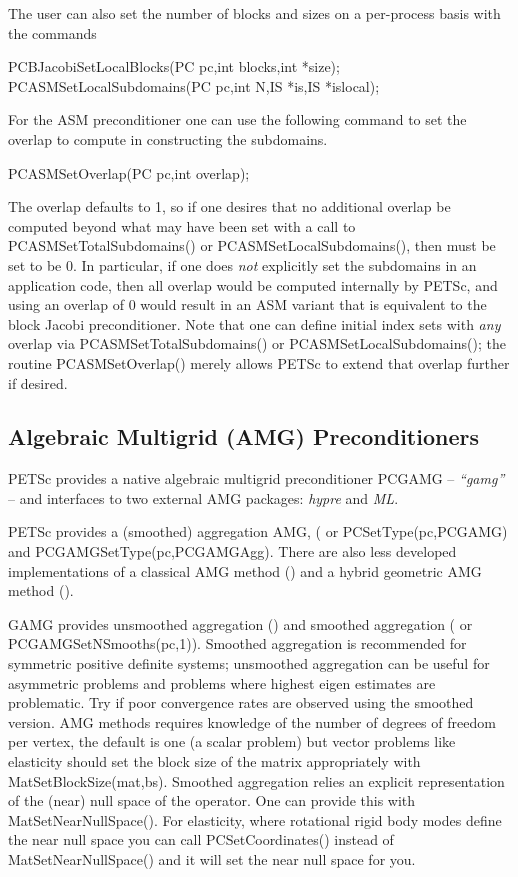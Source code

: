 The user can also set the number of blocks and sizes on a per-process
basis with the commands
\begin{tabbing}
  PCBJacobiSetLocalBlocks(PC pc,int blocks,int *size);\\
  PCASMSetLocalSubdomains(PC pc,int N,IS *is,IS *islocal);
\end{tabbing}

For the ASM preconditioner one can use the following command to set
the overlap to compute in constructing the subdomains.
\begin{tabbing}
  PCASMSetOverlap(PC pc,int overlap);
\end{tabbing}
The overlap defaults to 1, so if one desires that no additional
overlap be computed beyond what may have been set with a call to PCASMSetTotalSubdomains() or PCASMSetLocalSubdomains(), then
 must be set to be 0.  In particular, if one does {\em
not} explicitly set the subdomains in an application code, then all
overlap would be computed internally by PETSc, and using an overlap of
0 would result in an ASM variant that is equivalent to the block
Jacobi preconditioner.  Note that one can define initial index sets
 with {\em any} overlap via PCASMSetTotalSubdomains() or
PCASMSetLocalSubdomains(); the routine PCASMSetOverlap()
merely allows PETSc to extend that overlap further if desired.

\subsection{Algebraic Multigrid (AMG) Preconditioners}

PETSc provides a native algebraic multigrid preconditioner PCGAMG -- {\it ``gamg''} -- and interfaces to two
external AMG packages: {\it hypre} and {\it ML}.

PETSc provides a (smoothed) aggregation AMG, ( or  PCSetType(pc,PCGAMG) and PCGAMGSetType(pc,PCGAMGAgg).
There are also less developed implementations of a classical AMG method ()  and a hybrid geometric AMG method ().

GAMG provides unsmoothed aggregation () and smoothed aggregation ( or PCGAMGSetNSmooths(pc,1)).
Smoothed aggregation is recommended for symmetric positive definite
systems;  unsmoothed aggregation can be useful for asymmetric
problems and problems where highest eigen estimates are problematic. Try   if poor convergence rates are observed using the smoothed version.
AMG methods requires knowledge of the number of degrees of
freedom per vertex, the default is one (a scalar problem) but vector problems like elasticity should set the block size of the matrix appropriately with MatSetBlockSize(mat,bs).
Smoothed aggregation relies an explicit representation of the (near) null space of the operator.
One can provide this with MatSetNearNullSpace().
For elasticity, where rotational rigid body modes define the near null space you can call PCSetCoordinates() instead of MatSetNearNullSpace() and it will set the near null space for you.

